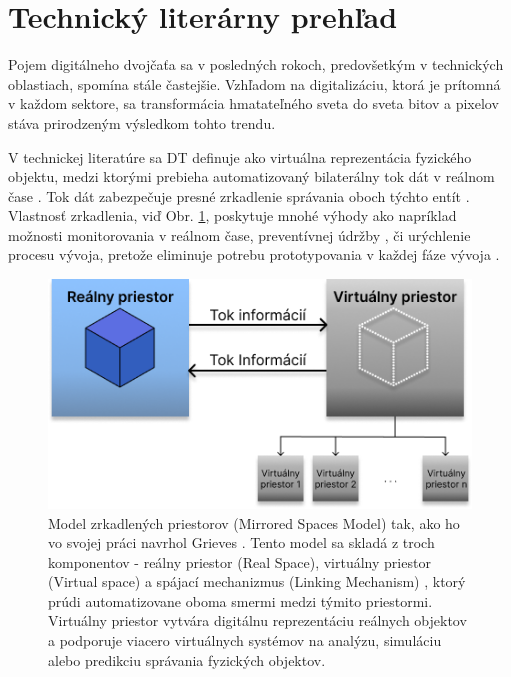 \section{Technický literárny prehľad}
\par{
Pojem digitálneho dvojčaťa sa v posledných rokoch, predovšetkým v technických oblastiach, spomína stále častejšie. Vzhľadom na digitalizáciu, ktorá je prítomná v každom sektore, sa transformácia hmatateľného sveta do sveta bitov a pixelov stáva prirodzeným výsledkom tohto trendu. 
}
\par{
V technickej literatúre sa DT definuje ako virtuálna reprezentácia fyzického objektu, medzi ktorými prebieha automatizovaný bilaterálny tok dát v reálnom čase \cite{DT:OriginToFuture}. Tok dát zabezpečuje presné zrkadlenie správania oboch týchto entít \cite{systematicReview}. Vlastnosť zrkadlenia, viď Obr. \ref{fig:PLM}, poskytuje mnohé výhody ako napríklad možnosti monitorovania v reálnom čase, preventívnej údržby \cite{5g&beyond}, či urýchlenie procesu vývoja, pretože eliminuje potrebu prototypovania v každej fáze vývoja \cite{mitigating_book}.
}
\newline
\begin{figure}[H]
    \centering
    \includegraphics[width=0.8\linewidth]{assets/images/Grieves_PLM_model.png}
    \caption[Model zrkadlených priestorov]{Model zrkadlených priestorov (Mirrored Spaces Model) tak, ako ho vo svojej práci navrhol Grieves \cite{Grieves}. Tento model sa skladá z troch komponentov - reálny priestor (Real Space), virtuálny priestor (Virtual space) a spájací mechanizmus (Linking Mechanism) \cite{DT:OriginToFuture}, ktorý prúdi automatizovane oboma smermi medzi týmito priestormi. Virtuálny priestor vytvára digitálnu reprezentáciu reálnych objektov a podporuje viacero virtuálnych systémov na analýzu, simuláciu alebo predikciu správania fyzických objektov.}
    \label{fig:PLM}
\end{figure}

